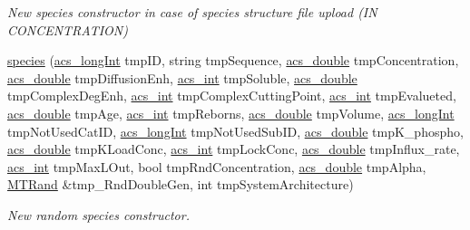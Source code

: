 \begin{DoxyCompactItemize}
\begin{DoxyCompactList}\small\item\em New species constructor in case of species structure file upload (I\-N C\-O\-N\-C\-E\-N\-T\-R\-A\-T\-I\-O\-N) \end{DoxyCompactList}\item 
\hyperlink{a00022_abf5c41dde613b92c0dba675481ceb4f9}{species} (\hyperlink{a00024_a19319d75f02db4308bc5c0026d98cd85}{acs\-\_\-long\-Int} tmp\-I\-D, string tmp\-Sequence, \hyperlink{a00024_ab776853a005fcbf56af0424a2a4dd607}{acs\-\_\-double} tmp\-Concentration, \hyperlink{a00024_ab776853a005fcbf56af0424a2a4dd607}{acs\-\_\-double} tmp\-Diffusion\-Enh, \hyperlink{a00024_a8d277355641a098190360234e2ebde35}{acs\-\_\-int} tmp\-Soluble, \hyperlink{a00024_ab776853a005fcbf56af0424a2a4dd607}{acs\-\_\-double} tmp\-Complex\-Deg\-Enh, \hyperlink{a00024_a8d277355641a098190360234e2ebde35}{acs\-\_\-int} tmp\-Complex\-Cutting\-Point, \hyperlink{a00024_a8d277355641a098190360234e2ebde35}{acs\-\_\-int} tmp\-Evalueted, \hyperlink{a00024_ab776853a005fcbf56af0424a2a4dd607}{acs\-\_\-double} tmp\-Age, \hyperlink{a00024_a8d277355641a098190360234e2ebde35}{acs\-\_\-int} tmp\-Reborns, \hyperlink{a00024_ab776853a005fcbf56af0424a2a4dd607}{acs\-\_\-double} tmp\-Volume, \hyperlink{a00024_a19319d75f02db4308bc5c0026d98cd85}{acs\-\_\-long\-Int} tmp\-Not\-Used\-Cat\-I\-D, \hyperlink{a00024_a19319d75f02db4308bc5c0026d98cd85}{acs\-\_\-long\-Int} tmp\-Not\-Used\-Sub\-I\-D, \hyperlink{a00024_ab776853a005fcbf56af0424a2a4dd607}{acs\-\_\-double} tmp\-K\-\_\-phospho, \hyperlink{a00024_ab776853a005fcbf56af0424a2a4dd607}{acs\-\_\-double} tmp\-K\-Load\-Conc, \hyperlink{a00024_a8d277355641a098190360234e2ebde35}{acs\-\_\-int} tmp\-Lock\-Conc, \hyperlink{a00024_ab776853a005fcbf56af0424a2a4dd607}{acs\-\_\-double} tmp\-Influx\-\_\-rate, \hyperlink{a00024_a8d277355641a098190360234e2ebde35}{acs\-\_\-int} tmp\-Max\-L\-Out, bool tmp\-Rnd\-Concentration, \hyperlink{a00024_ab776853a005fcbf56af0424a2a4dd607}{acs\-\_\-double} tmp\-Alpha, \hyperlink{a00016}{M\-T\-Rand} \&tmp\-\_\-\-Rnd\-Double\-Gen, int tmp\-System\-Architecture)
\begin{DoxyCompactList}\small\item\em New random species constructor. \end{DoxyCompactList}\item 

\end{DoxyCompactItemize}
